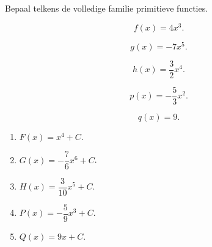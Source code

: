 \documentclass{ximera}
\begin{document}
\begin{oefening}{\oefB\ESS}

Bepaal telkens de volledige familie primitieve functies.

\begin{question}
\[
f(x)=4x^3.
\]
\end{question}

\begin{question}
\[
g(x)=-7x^5.
\]
\end{question}

\begin{question}
\[
h(x)=\frac{3}{2}x^4.
\]
\end{question}

\begin{question}
\[
p(x)=-\frac{5}{3}x^2.
\]
\end{question}

\begin{question}
\[
q(x)=9.
\]
\end{question}

\begin{oplossing}

\begin{enumerate}
\item $F(x)=x^4+C$.
\item $G(x)=-\dfrac{7}{6}x^6+C$.
\item $H(x)=\dfrac{3}{10}x^5+C$.
\item $P(x)=-\dfrac{5}{9}x^3+C$.
\item $Q(x)=9x+C$.
\end{enumerate}

\end{oplossing}

\end{oefening}


\end{document}
